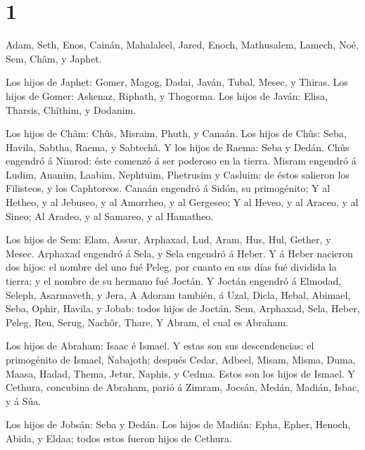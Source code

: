 \hypertarget{section}{%
\section{1}\label{section}}

 Adam, Seth, Enos,  Cainán, Mahalaleel, Jared,
 Enoch, Mathusalem, Lamech,  Noé, Sem, Châm, y
Japhet.

 Los hijos de Japhet: Gomer, Magog, Dadai, Javán, Tubal,
Mesec, y Thiras.  Los hijos de Gomer: Askenaz, Riphath, y
Thogorma.  Los hijos de Javán: Elisa, Tharsis, Chîthim, y
Dodanim.

 Los hijos de Châm: Chûs, Misraim, Phuth, y Canaán.
 Los hijos de Chûs: Seba, Havila, Sabtha, Raema, y Sabtechâ.
Y los hijos de Raema: Seba y Dedán.  Chûs engendró á
Nimrod: éste comenzó á ser poderoso en la tierra.  Misram
engendró á Ludim, Ananim, Laabim, Nephtuim,  Phetrusim y
Casluim: de éstos salieron los Filisteos, y los Caphtoreos.
 Canaán engendró á Sidón, su primogénito;  Y
al Hetheo, y al Jebuseo, y al Amorrheo, y al Gergeseo;  Y
al Heveo, y al Araceo, y al Sineo;  Al Aradeo, y al
Samareo, y al Hamatheo.

 Los hijos de Sem: Elam, Assur, Arphaxad, Lud, Aram, Hus,
Hul, Gether, y Mesec.  Arphaxad engendró á Sela, y Sela
engendró á Heber.  Y á Heber nacieron dos hijos: el nombre
del uno fué Peleg, por cuanto en sus días fué dividida la tierra; y el
nombre de su hermano fué Joctán.  Y Joctán engendró á
Elmodad, Seleph, Asarmaveth, y Jera,  A Adoram también, á
Uzal, Dicla,  Hebal, Abimael, Seba,  Ophir,
Havila, y Jobab: todos hijos de Joctán.  Sem, Arphaxad,
Sela,  Heber, Peleg, Reu,  Serug, Nachôr,
Thare,  Y Abram, el cual es Abraham.

 Los hijos de Abraham: Isaac é Ismael.  Y
estas son sus descendencias: el primogénito de Ismael, Nabajoth; después
Cedar, Adbeel, Misam,  Misma, Duma, Maasa, Hadad, Thema,
Jetur, Naphis, y Cedma. Estos son los hijos de Ismael.  Y
Cethura, concubina de Abraham, parió á Zimram, Jocsán, Medán, Madián,
Isbac, y á Súa.

 Los hijos de Jobsán: Seba y Dedán.  Los hijos
de Madián: Epha, Epher, Henoch, Abida, y Eldaa; todos estos fueron hijos
de Cethura.

